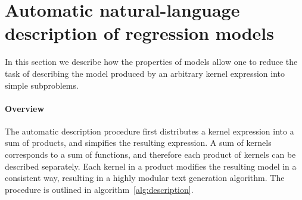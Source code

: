 \documentclass[letterpaper]{article}
\begin{document}

\section{Automatic natural-language description of regression models}
\label{sec:description}

In this section we describe how the properties of \gp{} models allow one to reduce the task of describing the model produced by an arbitrary kernel expression into simple subproblems.


\paragraph{Overview}

The automatic description procedure first distributes a kernel expression into a sum of products, and simpifies the resulting expression.
A sum of kernels corresponds to a sum of functions, and therefore each product of kernels can be described separately.
Each kernel in a product modifies the resulting model in a consistent way, resulting in a highly modular text generation algorithm.
The procedure is outlined in algorithm~\ref{alg:description}.

\end{document}

